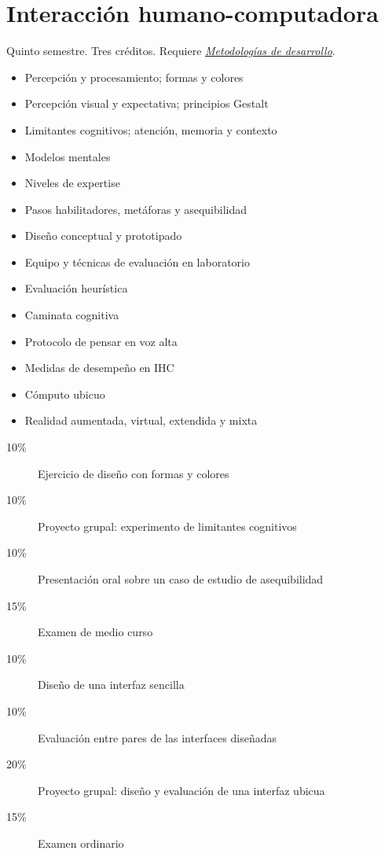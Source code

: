\documentclass{article}
\begin{document}
\begin{multicols}{4}
\newpage

\hypertarget{ihc}{\section*{Interacci\'{o}n humano-computadora}}   

Quinto semestre. Tres cr\'{e}ditos. Requiere \hyperlink{mdd}{\em
  Metodolog\'{i}as de desarrollo}.

\begin{itemize}
\item{Percepci\'{o}n y procesamiento; formas y colores}
\item{Percepci\'{o}n visual y expectativa; principios Gestalt}
\item{Limitantes cognitivos; atenci\'{o}n, memoria y contexto}
\item{Modelos mentales}
\item{Niveles de expertise}
\item{Pasos habilitadores, met\'{a}foras y asequibilidad}
\item{Dise\~{n}o conceptual y prototipado}
\item{Equipo y t\'{e}cnicas de evaluaci\'{o}n en laboratorio}
\item{Evaluaci\'{o}n heur\'{i}stica}
\item{Caminata cognitiva}
\item{Protocolo de pensar en voz alta}
\item{Medidas de desempe\~{n}o en IHC}
\item{C\'{o}mputo ubicuo}
\item{Realidad aumentada, virtual, extendida y mixta}
\end{itemize}

\begin{description}
\item[10\%]{Ejercicio de dise\~{n}o con formas y colores}
\item[10\%]{Proyecto grupal: experimento de limitantes cognitivos}
\item[10\%]{Presentaci\'{o}n oral sobre un caso de estudio de asequibilidad}  
\item[15\%]{Examen de medio curso}
\item[10\%]{Dise\~{n}o de una interfaz sencilla}
\item[10\%]{Evaluaci\'{o}n entre pares de las interfaces dise\~{n}adas}
\item[20\%]{Proyecto grupal: dise\~{n}o y evaluaci\'{o}n de una interfaz ubicua}
\item[15\%]{Examen ordinario}
\end{description}  


\end{multicols}
\end{document}
